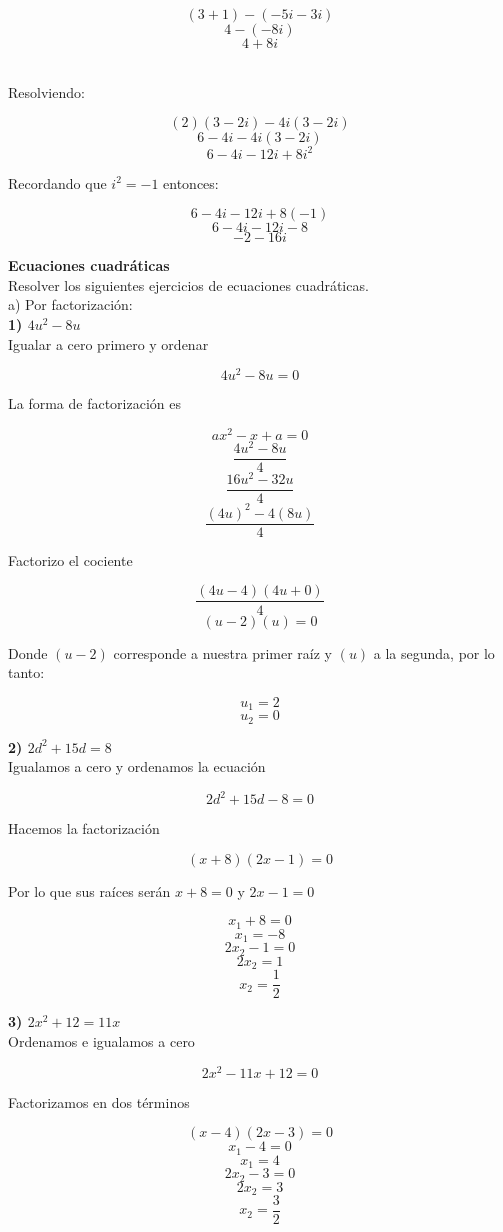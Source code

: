 \documentclass[11pt]{report}
\begin{document}
$$(3+1)-(-5i-3i)$$
$$4-(-8i)$$
$$4+8i$$

\\[2mm]
\indent Resolviendo:

$$(2)(3-2i)-4i(3-2i)$$
$$6-4i-4i(3-2i)$$
$$6-4i-12i+8i^2$$

\indent Recordando que $i^2=-1$ entonces:

$$6-4i-12i+8(-1)$$
$$6-4i-12i-8$$
$$-2-16i$$

\pagebreak \textbf {Ecuaciones cuadráticas}\\[2mm]
Resolver los siguientes ejercicios de ecuaciones cuadráticas.\\[2mm]
a) Por factorización:\\[2mm]
\indent \textbf {1) $4u^2-8u$}\\[2mm]
\indent Igualar a cero primero y ordenar

$$4u^2-8u=0$$

\indent La forma de factorización es

$$ax^2-x+a=0$$
$$\frac{4u^{2}-8u}{4}$$
$$\frac{16u^{2}-32u}{4}$$
$$\frac{(4u)^{2}-4(8u)}{4}$$

\indent Factorizo el cociente

$$\frac { (4u-4)(4u+0) } {4}$$
$$(u-2)(u)=0$$

\indent Donde $(u-2)$ corresponde a nuestra primer raíz y $(u)$ a la segunda, por lo tanto:

$$u_1=2$$ $$u_2=0$$

\indent \textbf {2) $2d^{2}+15d=8$}\\[2mm]
\indent Igualamos a cero y ordenamos la ecuación

$$2d^{2}+15d-8=0$$

\indent Hacemos la factorización

$$(x+8)(2x-1)=0$$

\indent Por lo que sus raíces serán $x+8=0$ y $2x-1=0$

$$x_1+8=0$$
$$x_1=-8$$
$$2x_2-1=0$$
$$2x_2=1$$
$$x_2=\frac{1}{2}$$

\indent \textbf {3) $2x^{2}+12=11x$}\\[2mm]
\indent Ordenamos e igualamos a cero

$$2x^{2}-11x+12=0$$

\indent Factorizamos en dos términos

$$(x-4)(2x-3)=0$$
$$x_1-4=0$$
$$x_1=4$$
$$2x_2-3=0$$
$$2x_2=3$$
$$x_2=\frac{3}{2}$$
\end{document}
